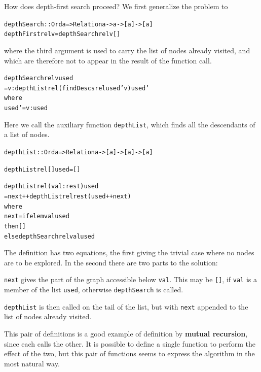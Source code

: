 How does depth-first search proceed? We first generalize the problem to
\begin{alltt}
depthSearch :: Ord a => Relation a -> a -> [a] -> [a]
depthFirst rel v = depthSearch rel v []
\end{alltt}
where the third argument is used to carry the list of nodes already
visited, and which are therefore not to appear in the result of the function call.
\begin{alltt}
depthSearch rel v used
        = v : depthList rel (findDescs rel used' v) used'
          where
          used' = v:used
\end{alltt}
Here we call the auxiliary function \texttt{depthList}, which finds all the
descendants of a list of nodes. 
\begin{alltt}
depthList :: Ord a => Relation a -> [a] -> [a] -> [a]

depthList rel [] used = [] 

depthList rel (val:rest) used
  = next ++ depthList rel rest (used++next)
    where
    next = if   elem val used
           then []
           else depthSearch rel val used
\end{alltt}
The definition has two equations, the first giving the trivial case where no
nodes are to be explored. In the second there are two parts to the solution:
\begin{titemize}
\item \texttt{next} gives the part of the graph accessible below \texttt{val}. This
may be \texttt{[]}, if \texttt{val} is a member of the list \texttt{used}, otherwise
\texttt{depthSearch} is called. 
\item \texttt{depthList} is then called on the tail
of the list, but with \texttt{next} appended to the list of nodes already visited.
\end{titemize}
This pair of definitions is a good example of definition by \textbf{mutual
recursion}, since each calls the other. It is possible to define a single
function to perform the effect of the two, but this pair of functions seems
to express the algorithm in the most natural way.




